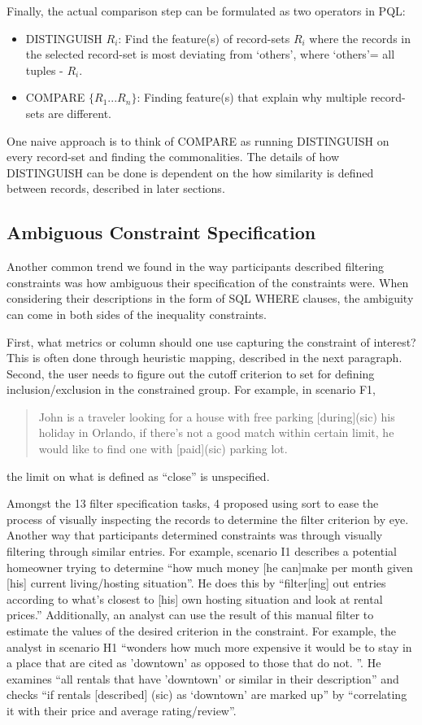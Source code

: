 \documentclass{sig-alternate-05-2015}
\begin{document}
  \par Finally, the actual comparison step can be formulated as two operators in PQL:
  \begin{itemize}
  \item DISTINGUISH $R_i$: Find the feature(s) of record-sets $R_i$ where the records in the selected record-set is most deviating from `others', where `others'= all tuples - $R_i$. 
  \item COMPARE $\{R_1 ...R_n\}$: Finding feature(s) that explain why multiple record-sets are different.
  \end{itemize}
  One naive approach is to think of COMPARE as running DISTINGUISH on every record-set and finding the commonalities. The details of how DISTINGUISH can be done is dependent on the how similarity is defined between records, described in later sections.
\subsection{Ambiguous Constraint Specification}
  Another common trend we found in the way participants described filtering constraints was how ambiguous their specification of the constraints were. When considering their descriptions in the form of SQL WHERE clauses, the ambiguity can come in both sides of the inequality constraints. 
  \par First, what metrics or column should one use capturing the constraint of interest? This is often done through heuristic mapping, described in the next paragraph. Second, the user needs to figure out the cutoff criterion to set for defining inclusion/exclusion in the constrained group. For example, in scenario F1, 
  \begin{quote}
  John is a traveler looking for a house with free parking [during](sic) his holiday in Orlando, if there's not a good match within certain limit, he would like to find one with [paid](sic) parking lot.  
  \end{quote}
  the limit on what is defined as ``close'' is unspecified.  
  \par Amongst the 13 filter specification tasks, 4 proposed using sort to ease the process of visually inspecting the records to determine the filter criterion by eye. Another way that participants determined constraints was through visually filtering through similar entries. For example, scenario I1 describes a potential homeowner trying to determine ``how much money [he can]make per month given [his] current living/hosting situation''. He does this by ``filter[ing] out entries according to what's closest to [his] own hosting situation and look at rental prices.'' Additionally, an analyst can use the result of this manual filter to estimate the values of the desired criterion in the constraint.  For example, the analyst in scenario H1 ``wonders how much more expensive it would be to stay in a place that are cited as 'downtown' as opposed to those that do not. ''. He examines ``all rentals that have 'downtown' or similar in their description'' and checks ``if rentals [described] (sic) as `downtown' are marked up'' by ``correlating it with their price and average rating/review''.
\end{document}
